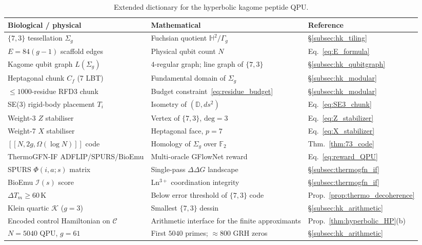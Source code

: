 \documentclass[11pt,oneside]{amsbook}
\numberwithin{equation}{section}
\theoremstyle{plain}
\theoremstyle{definition}
\theoremstyle{remark}
\begin{document}
\begin{table}[htbp]
\centering
\caption{Extended dictionary for the hyperbolic kagome peptide QPU.}
\label{tab:hyperbolic_dictionary}
\renewcommand{\arraystretch}{1.3}
\begin{tabular}{lll}
\toprule
\textbf{Biological / physical} & \textbf{Mathematical} & \textbf{Reference} \\
\midrule
$\{7,3\}$ tessellation $\Sigma_g$ & Fuchsian quotient $\mathbb{H}^2/\Gamma_g$
  & \S\ref{subsec:hk_tiling} \\
$E = 84(g-1)$ scaffold edges & Physical qubit count $N$
  & Eq.~\eqref{eq:E_formula} \\
Kagome qubit graph $L(\Sigma_g)$ & $4$-regular graph; line graph of $\{7,3\}$
  & \S\ref{subsec:hk_qubitgraph} \\
Heptagonal chunk $C_f$ (7 LBT) & Fundamental domain of $\Sigma_g$
  & \S\ref{subsec:hk_modular} \\
$\le 1000$-residue RFD3 chunk & Budget constraint~\eqref{eq:residue_budget}
  & \S\ref{subsec:hk_modular} \\
SE(3) rigid-body placement $T_i$ & Isometry of $(\mathbb{D},ds^2)$
  & Eq.~\eqref{eq:SE3_chunk} \\
Weight-3 $Z$ stabiliser & Vertex of $\{7,3\}$, $\mathrm{deg}=3$
  & Eq.~\eqref{eq:Z_stabilizer} \\
Weight-7 $X$ stabiliser & Heptagonal face, $p=7$
  & Eq.~\eqref{eq:X_stabilizer} \\
$[[N, 2g, \Omega(\log N)]]$ code & Homology of $\Sigma_g$ over $\mathbb{F}_2$
  & Thm.~\ref{thm:73_code} \\
ThermoGFN-IF ADFLIP/SPURS/BioEmu & Multi-oracle GFlowNet reward
  & Eq.~\eqref{eq:reward_QPU} \\
SPURS $\Phi(i,a;s)$ matrix & Single-pass $\Delta\Delta G$ landscape
  & \S\ref{subsec:thermogfn_if} \\
BioEmu $\mathcal{I}(s)$ score & Ln$^{3+}$ coordination integrity
  & \S\ref{subsec:thermogfn_if} \\
$\Delta T_m \ge 60\,\text{K}$ & Below error threshold of $\{7,3\}$ code
  & Prop.~\ref{prop:thermo_decoherence} \\
Klein quartic $\mathcal{K}$ ($g=3$) & Smallest $\{7,3\}$ dessin
  & \S\ref{subsec:hk_arithmetic} \\
Encoded control Hamiltonian on $\mathcal{C}$ & Arithmetic interface for the finite approximants
  & Prop.~\ref{thm:hyperbolic_HP}(b) \\
$N=5040$ QPU, $g=61$ & First $5040$ primes; $\approx 800$ GRH zeros
  & \S\ref{subsec:hk_arithmetic} \\
\bottomrule
\end{tabular}
\end{table}
\end{document}
